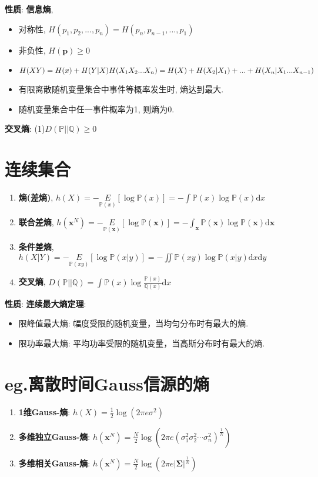 \documentclass{article}
\newcommand{\env}[2]{\begin{#1}#2\end{#1}}
\newcommand{\defi}[2]{\textbf{#1}, #2}
\newcommand{\bb}{\boldsymbol}
\newcommand{\P}{\mathbb P}
\newcommand{\d}{\mathrm d}
\newcommand{\l}{\left}
\newcommand{\r}{\right}
\begin{document}
                \textbf{性质}: \textbf{信息熵}, 
                    \env{itemize}{
                        \item 对称性, $H(p_1, p_2, ..., p_n) = H(p_n, p_{n-1}, ..., p_1)$
                        \item 非负性, $H(\bb p) \ge 0$
                        \item $H(XY) = H(x) + H(Y|X) \\ H(X_1 X_2 ... X_n) = H(X) + H(X_2|X_1) + ... + H(X_n|X_1...X_{n-1})$
                        \item 有限离散随机变量集合中事件等概率发生时, 熵达到最大.
                        \item 随机变量集合中任一事件概率为1, 则熵为0.
                    } 
                    \textbf{交叉熵}: (1)$D(\P || \mathbb Q) \ge 0$

            \section{连续集合}
                \env{enumerate}{
                    \item \defi{熵(差熵)}{$h(X)=-\underset{\P(x)}{E}[\log \P(x)]=-\int \P(x) \log \P(x) \d x$}
                    \item \defi{联合差熵}{$h(\bb x^N)=-\underset{\P(\bb x)}{E}[\log \P(\bb x)]=-\int_{\bb x} \P(\bb x) \log \P(\bb x) \d \bb x$}
                    \item \defi{条件差熵}{$h(X|Y)=-\underset{\P(xy)}{E}[\log \P(x|y)]=-\iint \P(xy) \log \P(x|y) \d x \d y$}
                    \item \defi{交叉熵}{$D(\P || \mathbb Q)=\int \P(x) \log \frac{\P(x)}{\mathbb Q(x)} \d x$}
                }
                
                \textbf{性质}: 
                    \textbf{连续最大熵定理}: \env{itemize}{
                    \item 限峰值最大熵: 幅度受限的随机变量，当均匀分布时有最大的熵.
                    \item 限功率最大熵: 平均功率受限的随机变量，当高斯分布时有最大的熵.
                    }
                
                \section{\textbf{eg.}离散时间Gauss信源的熵}
                    \env{enumerate}{
                    \item \textbf{1维Gauss-熵}: $h(X) = \frac{1}{2} \log \l(2 \pi e \sigma^2\r)$
                    \item \textbf{多维独立Gauss-熵}: $h\l(\bb x^N\r)=\frac{N}{2} \log \l(2 \pi e\l(\sigma_1^2 \sigma_2^2 \cdots \sigma_{n}^2\r)^{\frac{1}{N}}\r)$
                    \item \textbf{多维相关Gauss-熵}: $h\l(\bb x^N\r)=\frac{N}{2} \log \l(2 \pi e |\bb \Sigma|^{\frac{1}{N}}\r)$
                    }
    
\end{document}
